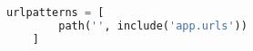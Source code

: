 \begin{lstlisting}[language=Python,caption={Fragment of Django route configuration file - config/urls.py},breaklines=true,label={lst:djangoUrlsConfig}]   
    urlpatterns = [
        path('', include('app.urls'))
    ]
\end{lstlisting}
